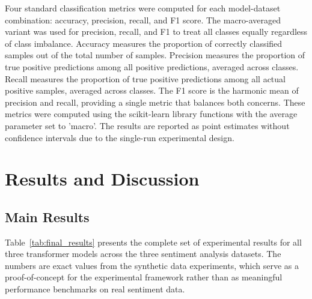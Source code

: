 \documentclass[conference]{IEEEtran}
\begin{document}
Four standard classification metrics were computed for each model-dataset combination: accuracy, precision, recall, and F1 score. The macro-averaged variant was used for precision, recall, and F1 to treat all classes equally regardless of class imbalance. Accuracy measures the proportion of correctly classified samples out of the total number of samples. Precision measures the proportion of true positive predictions among all positive predictions, averaged across classes. Recall measures the proportion of true positive predictions among all actual positive samples, averaged across classes. The F1 score is the harmonic mean of precision and recall, providing a single metric that balances both concerns. These metrics were computed using the scikit-learn library functions with the average parameter set to 'macro'. The results are reported as point estimates without confidence intervals due to the single-run experimental design.

\section{Results and Discussion}

\subsection{Main Results}

Table~\ref{tab:final_results} presents the complete set of experimental results for all three transformer models across the three sentiment analysis datasets. The numbers are exact values from the synthetic data experiments, which serve as a proof-of-concept for the experimental framework rather than as meaningful performance benchmarks on real sentiment data.

\begin{table}[h]
\centering
\caption{Final Results Table for BERT-base, RoBERTa-base, and DistilBERT-base on IMDB, SST-2, and Twitter Datasets}
\label{tab:final_results}
\end{table}
\end{document}
